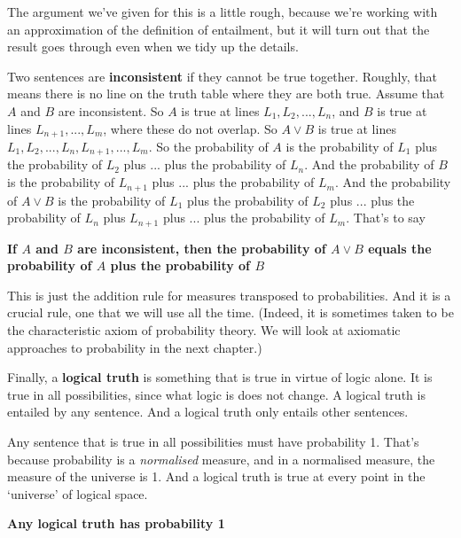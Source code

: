 The argument we've given for this is a little rough, because we're working with an approximation of the definition of entailment, but it will turn out that the result goes through even when we tidy up the details.

Two sentences are \textbf{inconsistent} if they cannot be true together. Roughly, that means there is no line on the truth table where they are both true. Assume that $A$ and $B$ are inconsistent. So $A$ is true at lines $L_1, L_2, ..., L_n$, and $B$ is true at lines $L_{n+1}, ..., L_m$, where these do not overlap. So $A \vee B$ is true at lines $L_1, L_2, ..., L_n, L_{n+1}, ..., L_m$. So the probability of $A$ is the probability of $L_1$ plus the probability of $L_2$ plus $...$ plus the probability of $L_n$. And the probability of $B$ is the probability of $L_{n+1}$ plus  $...$ plus the probability of $L_m$. And the probability of $A \vee B$ is the probability of $L_1$ plus the probability of $L_2$ plus $...$ plus the probability of $L_n$ plus $L_{n+1}$ plus  $...$ plus the probability of $L_m$. That's to say

\begin{itemize*}
\item \textbf{If $A$ and $B$ are inconsistent, then the probability of $A \vee B$ equals the probability of $A$ plus the probability of $B$}
\end{itemize*}

This is just the addition rule for measures transposed to probabilities. And it is a crucial rule, one that we will use all the time. (Indeed, it is sometimes taken to be the characteristic axiom of probability theory. We will look at axiomatic approaches to probability in the next chapter.)

Finally, a \textbf{logical truth} is something that is true in virtue of logic alone. It is true in all possibilities, since what logic is does not change. A logical truth is entailed by any sentence. And a logical truth only entails other sentences.

Any sentence that is true in all possibilities must have probability 1. That's because probability is a \textit{normalised} measure, and in a normalised measure, the measure of the universe is 1. And a logical truth is true at every point in the `universe' of logical space.

\begin{itemize*}
\item \textbf{Any logical truth has probability 1}
\end{itemize*}
